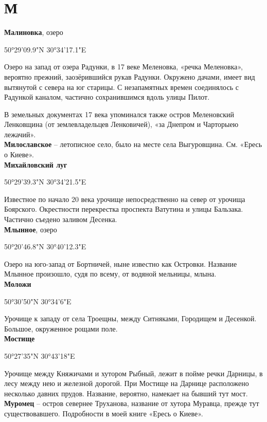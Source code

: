 \chapter*{М}

\textbf{Малиновка}, озеро 

50°29'09.9"N 30°34'17.1"E

Озеро на запад от озера Радунки, в 17 веке  Меленовка, «речка Меленовка», вероятно прежний, заозёрившийся рукав Радунки. Окружено дачами, имеет вид вытянутой с севера на юг старицы. С незапамятных времен соединялось с Радункой каналом, частично сохранившимся вдоль улицы Пилот.

В земельных документах 17 века упоминался также остров Меленовский Ленковщина (от землевладельцев Ленковичей), «за Днепром и Чарторыею лежачий».\\

\textbf{Милославское} – летописное село, было на месте села Выгуровщина. См. «Ересь о Киеве».\\

\textbf{Михайловский луг} 

50°29'39.3"N 30°34'21.5"E

Известное по начало 20 века урочище непосредственно на север от урочища Боярского. Окрестности перекрестка проспекта Ватутина и улицы Бальзака. Частично съедено заливом Десенка.\\

\textbf{Млынное}, озеро

50°20'46.8"N 30°40'12.3"E

Озеро на юго-запад от Бортничей, ныне известно как Островки. Название Млынное произошло, судя по всему, от водяной мельницы, млына.\\

\textbf{Моложи} 

50°30'50"N 30°34'6"E

Урочище к западу от села Троещны, между Ситняками, Городищем и Десенкой. Большое, окруженное рощами поле.\\

\textbf{Мостище}

50°27'35"N 30°43'18"E

Урочище между Княжичами и хутором Рыбный, лежит в пойме речки Дарницы, в лесу между нею и железной дорогой. При Мостище на Дарнице расположено несколько давних прудов. Название, вероятно, намекает на бывший тут мост.\\

\textbf{Муромец} – остров севернее Труханова, название от хутора Муравца, прежде тут существовавшего. Подробности в моей книге «Ересь о Киеве».

